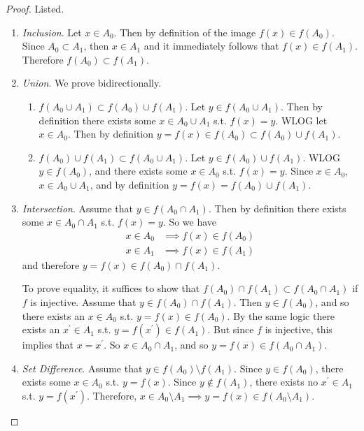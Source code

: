  \begin{proof}
    Listed. 
    \begin{enumerate}
      \item \textit{Inclusion}. Let $x \in A_0$. Then by definition of the image $f(x) \in f(A_0)$. Since $A_0 \subset A_1$, then $x \in A_1$ and it immediately follows that $f(x) \in f(A_1)$. Therefore $f(A_0) \subset f(A_1)$. 

      \item \textit{Union}. We prove bidirectionally. 
      \begin{enumerate}
        \item $f(A_0 \cup A_1) \subset f(A_0) \cup f(A_1)$. Let $y \in f(A_0 \cup A_1)$. Then by definition there exists some $x \in A_0 \cup A_1$ s.t. $f(x) = y$. WLOG let $x \in A_0$. Then by definition $y = f(x) \in f(A_0) \subset f(A_0) \cup f(A_1)$. 

        \item $f(A_0) \cup f(A_1) \subset f(A_0 \cup A_1)$. Let $y \in f(A_0) \cup f(A_1)$. WLOG $y \in f(A_0)$, and there exists some $x \in A_0$ s.t. $f(x) = y$. Since $x \in A_0$, $x \in A_0 \cup A_1$, and by definition $y = f(x) = f(A_0) \cup f(A_1)$. 
      \end{enumerate}

      \item \textit{Intersection}. Assume that $y \in f(A_0 \cap A_1)$. Then by definition there exists some $x \in A_0 \cap A_1$ s.t. $f(x) = y$. So we have 
      \begin{align}
        x \in A_0 & \implies f(x) \in f(A_0) \\
        x \in A_1 & \implies f(x) \in f(A_1)
      \end{align} 
      and therefore $y = f(x) \in f(A_0) \cap f(A_1)$. 

      To prove equality, it suffices to show that $f(A_0) \cap f(A_1) \subset f(A_0 \cap A_1)$ if $f$ is injective. Assume that $y \in f(A_0) \cap f(A_1)$. Then $y \in f(A_0)$, and so there exists an $x \in A_0$ s.t. $y = f(x) \in f(A_0)$. By the same logic there exists an $x^\prime \in A_1$ s.t. $y = f(x^\prime) \in f(A_1)$. But since $f$ is injective, this implies that $x = x^\prime$. So $x \in A_0 \cap A_1$, and so $y = f(x) \in f(A_0 \cap A_1)$. 

      \item \textit{Set Difference}. Assume that $y \in f(A_0) \setminus f(A_1)$. Since $y \in f(A_0)$, there exists some $x \in A_0$ s.t. $y = f(x)$. Since $y \not\in f(A_1)$, there exists no $x^\prime \in A_1$ s.t. $y = f(x^\prime)$.  Therefore, $x \in A_0 \setminus A_1 \implies y = f(x) \in f(A_0 \setminus A_1)$. 


\end{enumerate}
\end{proof}
